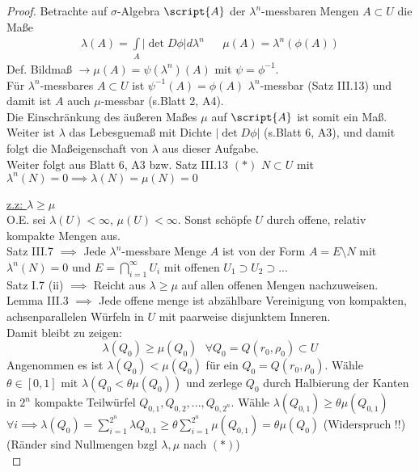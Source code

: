   \begin{proof}
    Betrachte auf $\sigma$-Algebra $\script{A}$ der $\lambda^n$-messbaren Mengen $A\subset U$ die Maße
    \begin{align*}
    	\lambda(A) = \int\limits_A |\det{D\phi}|d\lambda^n && \mu(A) = \lambda^n(\phi(A))	
    \end{align*}
	Def. Bildmaß $\rightarrow \mu(A) = \psi(\lambda^n)(A)$ mit $\psi = \phi^{-1}$. \\
	Für $\lambda^n$-messbares $A\subset U$ ist $\psi^{-1}(A) = \phi(A)$ $\lambda^n$-messbar	(Satz III.13) und damit ist $A$ auch $\mu$-messbar (s.Blatt 2, A4). \\
	Die Einschränkung des äußeren Maßes $\mu$ auf $\script{A}$ ist somit ein Maß. \\
	Weiter ist $\lambda$ das Lebesguemaß mit Dichte $|\det{D\phi}|$ (s.Blatt 6, A3), und damit folgt die Maßeigenschaft von $\lambda$ aus dieser Aufgabe. \\
	Weiter folgt aus Blatt 6, A3 bzw. Satz III.13 $(\ast)$ $N\subset U$ mit $\lambda^n(N)= 0 \implies \lambda(N) = \mu(N) = 0$
	\item[]\underline{z.z: $\lambda \geq \mu$} \\
	O.E. sei $\lambda(U) < \infty$, $\mu(U) < \infty$. Sonst schöpfe $U$ durch offene, relativ kompakte Mengen aus. \\
	Satz III.7 $\implies$ Jede $\lambda^n$-messbare Menge $A$ ist von der Form $A = E \setminus N$ mit $\lambda^n(N) = 0$ und $E = \bigcap\limits_{i=1}^\infty U_i$ mit offenen $U_1 \supset U_2 \supset ...$ \\
	Satz I.7 (ii) $\implies$ Reicht aus $\lambda \geq \mu$ auf allen offenen Mengen nachzuweisen. \\
	Lemma III.3 $\implies$ Jede offene menge ist abzählbare Vereinigung von kompakten, achsenparallelen Würfeln in $U$ mit paarweise disjunktem Inneren. \\
	Damit bleibt zu zeigen: $$ \lambda(Q_0) \geq \mu(Q_0) \text{   } \forall Q_0 = Q(r_0, \rho_0)\subset U$$
	Angenommen es ist $\lambda(Q_0) < \mu(Q_0)$ für ein $Q_0 = Q(r_0, \rho_0)$. Wähle $\theta \in [0,1]$ mit $\lambda(Q_0 < \theta \mu(Q_0))$ und zerlege $Q_0$ durch Halbierung der Kanten in $2^n$ kompakte Teilwürfel $Q_{0,1}, Q_{0,2},...,Q_{0,2^n}$. Wähle $\lambda(Q_{0,1}) \geq \theta \mu(Q_{0,1})$ $\forall i \implies \lambda(Q_0) = \sum\limits_{i=1}^{2^n} \lambda{Q_{0,1}} \geq \theta \sum\limits_{i=1}^{2^n} \mu(Q_{0,1}) = \theta \mu(Q_0)$ (Widerspruch !!) \\
	(Ränder sind Nullmengen bzgl $\lambda, \mu$ nach $(\ast)$) \\

\end{proof}
